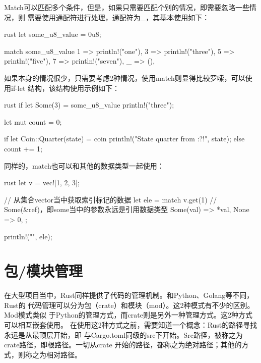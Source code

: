 Match可以匹配多个条件，但是，如果只需要匹配个别的情况，即需要忽略一些情况，则
需要使用通配符进行处理，通配符为\_，其基本使用如下：
\begin{code-block}{rust}
let some_u8_value = 0u8;

match some_u8_value {
    1 => println!("one"),
    3 => println!("three"),
    5 => println!("five"),
    7 => println!("seven"),
    _ => (),
}
\end{code-block}
如果本身的情况很少，只需要考虑2种情况，使用match则显得比较罗嗦，可以使用if-let
结构，该结构使用示例如下：
\begin{code-block}{rust}
if let Some(3) = some_u8_value {
    println!("three");
}

let mut count = 0;

if let Coin::Quarter(state) = coin {
    println!("State quarter from {:?}!", state);
} else {
    count += 1;
}
\end{code-block}

同样的，match也可以和其他的数据类型一起使用：
\begin{code-block}{rust}
let v = vec![1, 2, 3];

// 从集合vector当中获取索引标记的数据
let ele = match v.get(1) {
    // Some(&ref)，即some当中的参数永远是引用数据类型
    Some(val) => *val,
    None => 0,
};

println!("{}", ele);
\end{code-block}

\section{包/模块管理}
在大型项目当中，Rust同样提供了代码的管理机制。和Python、Golang等不同，Rust的
代码管理可以分为包（crate）和模块（mod）。这2种模式有不少的区别。Mod模式类似
于Python的管理方式，而crate则是另外一种管理方式。这2种方式可以相互嵌套使用。
在使用这2种方式之前，需要知道一个概念：Rust的路径寻找永远是从最顶层开始，即
与Cargo.toml同级的src下开始。Src路径，被称之为crate路径，即根路径。一切从crate
开始的路径，都称之为绝对路径；其他的方式，则称之为相对路径。

